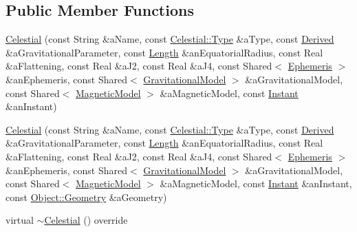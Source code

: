 \subsection*{Public Member Functions}
\begin{DoxyCompactItemize}
\item 
\hyperlink{classostk_1_1physics_1_1env_1_1obj_1_1_celestial_a9873ec6b48f6a0980dd604806d2d4840}{Celestial} (const String \&a\+Name, const \hyperlink{classostk_1_1physics_1_1env_1_1obj_1_1_celestial_aa0711d887522b35b2b3630156d912779}{Celestial\+::\+Type} \&a\+Type, const \hyperlink{classostk_1_1physics_1_1units_1_1_derived}{Derived} \&a\+Gravitational\+Parameter, const \hyperlink{classostk_1_1physics_1_1units_1_1_length}{Length} \&an\+Equatorial\+Radius, const Real \&a\+Flattening, const Real \&a\+J2, const Real \&a\+J4, const Shared$<$ \hyperlink{classostk_1_1physics_1_1env_1_1_ephemeris}{Ephemeris} $>$ \&an\+Ephemeris, const Shared$<$ \hyperlink{namespaceostk_1_1physics_1_1env_1_1obj_a50c0bc72e8880f2fa2a910a81e050c97}{Gravitational\+Model} $>$ \&a\+Gravitational\+Model, const Shared$<$ \hyperlink{namespaceostk_1_1physics_1_1env_1_1obj_a11552c1290e2f6b4693ea00c2df2c80d}{Magnetic\+Model} $>$ \&a\+Magnetic\+Model, const \hyperlink{classostk_1_1physics_1_1time_1_1_instant}{Instant} \&an\+Instant)
\item 
\hyperlink{classostk_1_1physics_1_1env_1_1obj_1_1_celestial_aa7e7d7dbde7fae72ffbd859448f5397a}{Celestial} (const String \&a\+Name, const \hyperlink{classostk_1_1physics_1_1env_1_1obj_1_1_celestial_aa0711d887522b35b2b3630156d912779}{Celestial\+::\+Type} \&a\+Type, const \hyperlink{classostk_1_1physics_1_1units_1_1_derived}{Derived} \&a\+Gravitational\+Parameter, const \hyperlink{classostk_1_1physics_1_1units_1_1_length}{Length} \&an\+Equatorial\+Radius, const Real \&a\+Flattening, const Real \&a\+J2, const Real \&a\+J4, const Shared$<$ \hyperlink{classostk_1_1physics_1_1env_1_1_ephemeris}{Ephemeris} $>$ \&an\+Ephemeris, const Shared$<$ \hyperlink{namespaceostk_1_1physics_1_1env_1_1obj_a50c0bc72e8880f2fa2a910a81e050c97}{Gravitational\+Model} $>$ \&a\+Gravitational\+Model, const Shared$<$ \hyperlink{namespaceostk_1_1physics_1_1env_1_1obj_a11552c1290e2f6b4693ea00c2df2c80d}{Magnetic\+Model} $>$ \&a\+Magnetic\+Model, const \hyperlink{classostk_1_1physics_1_1time_1_1_instant}{Instant} \&an\+Instant, const \hyperlink{classostk_1_1physics_1_1env_1_1_object_a66e44a65aefb23a184a6de531e96935d}{Object\+::\+Geometry} \&a\+Geometry)
\item 
virtual \hyperlink{classostk_1_1physics_1_1env_1_1obj_1_1_celestial_aadbeb101aaa4c4acb136278385d2080b}{$\sim$\+Celestial} () override

\end{DoxyCompactItemize}
